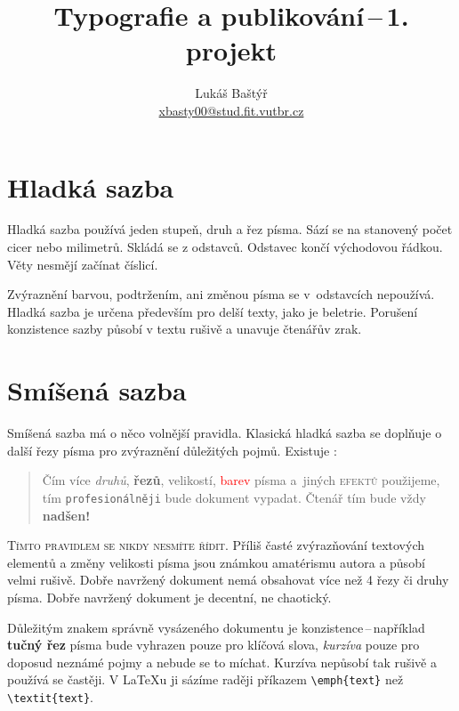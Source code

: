 \documentclass[10pt, twocolumn]{article}    %
\title{Typografie a publikování\,--\,1. projekt}
\author{Lukáš Baštýř \\
\href{mailto:xbasty00@stud.fit.vutbr.cz}{xbasty00@stud.fit.vutbr.cz}}
\date{}
\begin{document}
    \maketitle
    \section{Hladká sazba}

        Hladká sazba používá jeden stupeň, druh a řez písma.
        Sází se na stanovený počet cicer nebo milimetrů.
        Skládá se z odstavců. Odstavec končí východovou řádkou.
        Věty nesmějí začínat číslicí.

        Zvýraznění barvou, podtržením, ani změnou písma se v~odstavcích nepoužívá.
        Hladká sazba je určena především pro delší texty, jako je beletrie.
        Porušení konzistence sazby působí v textu rušivě a unavuje čtenářův zrak.

    \section{Smíšená sazba}

        Smíšená sazba má o něco volnější pravidla.
        Klasická hladká sazba se doplňuje o další řezy písma pro zvýraznění důležitých pojmů.
        Existuje :

        \begin{quotation}
            Čím více \emph{druhů}, \textbf{řezů}, {\tiny velikostí}, \textcolor{red}{barev} písma a~jiných \textsc{efektů} použijeme, tím \texttt{profesionálněji} bude {\selectfont \large dokument} vypadat.
            {\Huge Č\huge t\LARGE e\Large n\large á\normalsize ř \small t\footnotesize í\scriptsize m} bude vždy {\Huge \textbf{nadšen!}}
        \end{quotation}

        \textsc{Tímto pravidlem se nikdy nesmíte řídit.}
        Příliš časté zvýrazňování textových elementů a změny velikosti písma jsou známkou amatérismu autora a působí velmi rušivě.
        Dobře navržený dokument nemá obsahovat více než 4 řezy či druhy písma.
        Dobře navržený dokument je decentní, ne chaotický.

        Důležitým znakem správně vysázeného dokumentu je konzistence\,--\,například \textbf{tučný řez} písma bude vyhrazen pouze pro klíčová slova, \emph{kurzíva} pouze pro doposud neznámé pojmy a nebude se to míchat.
        Kurzíva nepůsobí tak rušivě a používá se častěji.
        V \LaTeX u ji sázíme raději příkazem \verb|\emph{text}| než \verb|\textit{text}|.
\end{document}
